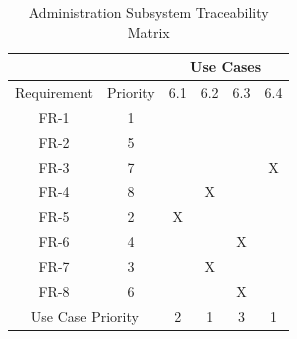 \documentclass{article}
\begin{document}
\begin{enumerate}
			\begin{table}[]
 \centering
 \caption{Administration Subsystem Traceability Matrix}
 \label{my-label}
 \begin{tabular}{cc|c|c|c|c|}
 \cline{3-6}
                                   &          & \multicolumn{4}{c|}{Use Cases} \\ \hline
 \multicolumn{1}{|c|}{Requirement} & Priority & 6.1    & 6.2   & 6.3   & 6.4   \\ \hline
 \multicolumn{1}{|c|}{FR-1}        & 1        &        &       &       &       \\ \hline
 \multicolumn{1}{|c|}{FR-2}        & 5        &        &       &       &       \\ \hline
 \multicolumn{1}{|c|}{FR-3}        & 7        &        &       &       & X     \\ \hline
 \multicolumn{1}{|c|}{FR-4}        & 8        &        & X     &       &       \\ \hline
 \multicolumn{1}{|c|}{FR-5}        & 2        & X      &       &       &       \\ \hline
 \multicolumn{1}{|c|}{FR-6}        & 4        &        &       & X     &       \\ \hline
 \multicolumn{1}{|c|}{FR-7}        & 3        &        & X     &       &       \\ \hline
 \multicolumn{1}{|c|}{FR-8}        & 6        &        &       & X     &       \\ \hline
 \multicolumn{2}{|c|}{Use Case Priority}      & 2      & 1     & 3     & 1     \\ \hline
 \end{tabular}
 \end{table}
	\end{enumerate}
	
\end{document}
